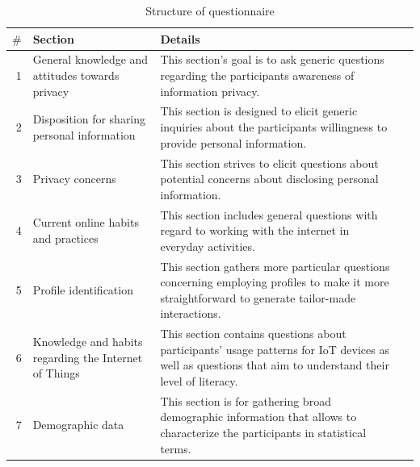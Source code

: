\begin{table}[H]
    \begin{center}
        \begin{tabular}{r *{3}{ p{6cm} }}
            \hline
            $\#$\hspace{0.5cm} & Section & Details \\
            \hline
            1\hspace{0.5cm} & General knowledge and attitudes towards privacy & This
            section's goal is to ask generic questions regarding the participants awareness
            of information privacy. \\
            \hline
            2\hspace{0.5cm} & Disposition for sharing personal information & This
            section is designed to elicit generic inquiries about the participants
            willingness to provide personal information. \\
            \hline
            3\hspace{0.5cm} & Privacy concerns & This section strives to
            elicit questions about potential concerns about disclosing
            personal information. \\
            \hline
            4\hspace{0.5cm} & Current online habits and practices & This
            section includes general questions with regard to working with
            the internet in everyday activities. \\
            \hline
            5\hspace{0.5cm} & Profile identification & This section gathers
            more particular questions concerning employing profiles to make
            it more straightforward to generate tailor-made interactions. \\
            \hline
            6\hspace{0.5cm} & Knowledge and habits regarding the Internet
            of Things & This section contains questions about participants'
            usage patterns for IoT devices as well as questions that aim to
            understand their level of literacy. \\
            \hline
            7\hspace{0.5cm} & Demographic data & This section is for
            gathering broad demographic information that allows
            to characterize the participants in statistical terms. \\
            \hline
        \end{tabular}
    \end{center}
    \vspace{1em}
    \caption{Structure of questionnaire}
    \label{table:questionnaire}
\end{table}

